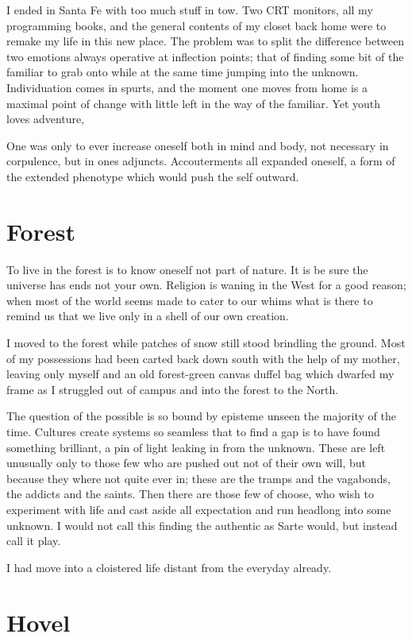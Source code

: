 \documentclass[ebook, 11pt, openright, onecolumn]{memoir}
\begin{document}
I ended in Santa Fe with too much stuff in tow.  Two CRT monitors, all my
programming books, and the general contents of my closet back home were to
remake my life in this new place.  The problem was to split the difference
between two emotions always operative at inflection points; that of finding some
bit of the familiar to grab onto while at the same time jumping into the
unknown.  Individuation comes in spurts, and the moment one moves from home
is a maximal point of change with little left in the way of the familiar.  Yet
youth loves adventure, 

One was only to ever increase oneself both in mind and body, not
necessary in corpulence, but in ones adjuncts.  Accouterments all expanded
oneself, a form of the extended phenotype which would push the self outward.

\chapter{Forest}
\label{cha:forest}

To live in the forest is to know oneself not part of nature.  It is be sure the
universe has ends not your own.  Religion is waning in the West for a good
reason; when most of the world seems made to cater to our whims what is there to
remind us that we live only in a shell of our own creation.

I moved to the forest while patches of snow still stood brindling the
ground. Most of my possessions had been carted back down south with the help of
my mother, leaving only myself and an old forest-green canvas duffel bag which
dwarfed my frame as I struggled out of campus and into the forest to the North.

The question of the possible is so bound by episteme unseen the majority of the
time.  Cultures create systems so seamless that to find a gap is to have found
something brilliant, a pin of light leaking in from the unknown.  These are left
unusually only to those few who are pushed out not of their own will, but
because they where not quite ever in; these are the tramps and the vagabonds,
the addicts and the saints.  Then there are those few of choose, who wish to
experiment with life and cast aside all expectation and run headlong into some
unknown.  I would not call this finding the authentic as Sarte would, but
instead call it play.

I had move into a cloistered life distant from the everyday already.

\chapter{Hovel}
\label{cha:hovel}
\end{document}
